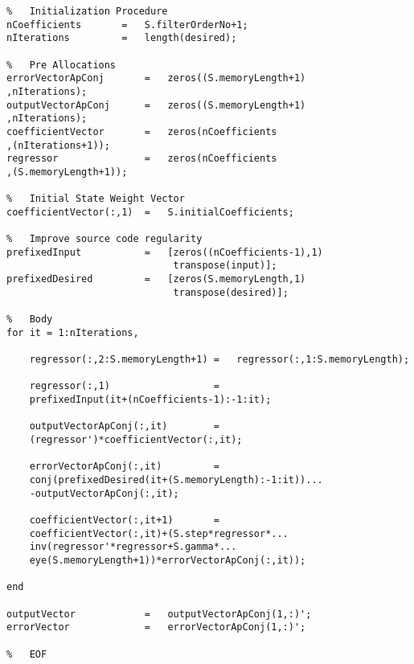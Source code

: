 \begin{lstlisting}
%   Initialization Procedure
nCoefficients       =   S.filterOrderNo+1;
nIterations         =   length(desired);

%   Pre Allocations
errorVectorApConj       =   zeros((S.memoryLength+1)
,nIterations);
outputVectorApConj      =   zeros((S.memoryLength+1)
,nIterations);
coefficientVector       =   zeros(nCoefficients
,(nIterations+1));
regressor               =   zeros(nCoefficients
,(S.memoryLength+1));

%   Initial State Weight Vector
coefficientVector(:,1)  =   S.initialCoefficients;

%   Improve source code regularity
prefixedInput           =   [zeros((nCoefficients-1),1)
                             transpose(input)];
prefixedDesired         =   [zeros(S.memoryLength,1)
                             transpose(desired)];

%   Body
for it = 1:nIterations,

    regressor(:,2:S.memoryLength+1) =   regressor(:,1:S.memoryLength);

    regressor(:,1)                  =
    prefixedInput(it+(nCoefficients-1):-1:it);

    outputVectorApConj(:,it)        =
    (regressor')*coefficientVector(:,it);

    errorVectorApConj(:,it)         =
    conj(prefixedDesired(it+(S.memoryLength):-1:it))...
    -outputVectorApConj(:,it);

    coefficientVector(:,it+1)       =
    coefficientVector(:,it)+(S.step*regressor*...
    inv(regressor'*regressor+S.gamma*...
    eye(S.memoryLength+1))*errorVectorApConj(:,it));

end

outputVector            =   outputVectorApConj(1,:)';
errorVector             =   errorVectorApConj(1,:)';

%   EOF
\end{lstlisting}

